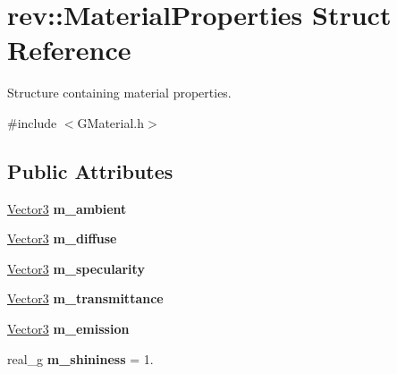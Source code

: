 \hypertarget{structrev_1_1_material_properties}{}\section{rev\+::Material\+Properties Struct Reference}
\label{structrev_1_1_material_properties}


Structure containing material properties.  




{\ttfamily \#include $<$G\+Material.\+h$>$}

\subsection*{Public Attributes}
\begin{DoxyCompactItemize}
\item 
\mbox{\label{structrev_1_1_material_properties_a60680cc1809e11f16335f452b9b772de}} 
\mbox{\hyperlink{classrev_1_1_vector}{Vector3}} {\bfseries m\+\_\+ambient}
\item 
\mbox{\label{structrev_1_1_material_properties_a4c3eabb4f6844b52be8643ccabfad3f0}} 
\mbox{\hyperlink{classrev_1_1_vector}{Vector3}} {\bfseries m\+\_\+diffuse}
\item 
\mbox{\label{structrev_1_1_material_properties_a122a0a50524b45c90bf3ad38362908b7}} 
\mbox{\hyperlink{classrev_1_1_vector}{Vector3}} {\bfseries m\+\_\+specularity}
\item 
\mbox{\label{structrev_1_1_material_properties_aa14b5a54f7187a15a32a3ddb255fcf3c}} 
\mbox{\hyperlink{classrev_1_1_vector}{Vector3}} {\bfseries m\+\_\+transmittance}
\item 
\mbox{\label{structrev_1_1_material_properties_ac42efc0268999285fbc383f2adc89230}} 
\mbox{\hyperlink{classrev_1_1_vector}{Vector3}} {\bfseries m\+\_\+emission}
\item 
\mbox{\label{structrev_1_1_material_properties_ab244c3a760218e0f7d395bd2b25499f3}} 
real\+\_\+g {\bfseries m\+\_\+shininess} = 1.
\item 

\end{DoxyCompactItemize}
